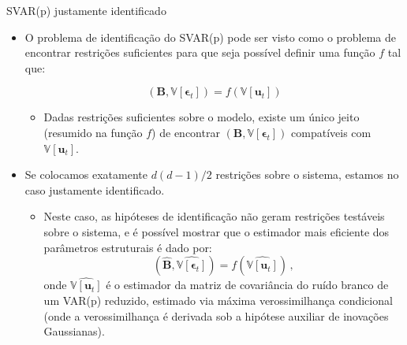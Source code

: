 \documentclass[11pt]{beamer}
\begin{document}
\begin{frame}{SVAR(p) justamente identificado}
	\begin{itemize}
		\item O problema de identificação do SVAR(p) pode ser visto como o problema de encontrar restrições suficientes para que seja possível definir uma função $f$ tal que:

		$$(\boldsymbol{B},\mathbb{V}[\boldsymbol{\epsilon}_t])=f(\mathbb{V}[\boldsymbol{u}_t])$$
	\vspace{-1em}
		\begin{itemize}
			\item Dadas restrições suficientes sobre o modelo, existe um único jeito (resumido na função $f$) de encontrar $(\boldsymbol{B},\mathbb{V}[\boldsymbol{\epsilon}_t])$ compatíveis com $\mathbb{V}[\boldsymbol{u}_t]$.
		\end{itemize}
		\item Se colocamos exatamente $d(d-1)/2$ restrições sobre o sistema, estamos no caso {\color{blue}justamente identificado}.
		\begin{itemize}
			\item Neste caso, as hipóteses de identificação não geram restrições testáveis sobre o sistema, e é possível mostrar que o estimador mais eficiente dos parâmetros estruturais é dado por:
				$$(\widehat{\boldsymbol{B}},\widehat{\mathbb{V}[\boldsymbol{\epsilon}_t]})=f(\widehat{\mathbb{V}[\boldsymbol{u}_t]})\, ,$$
			onde $\widehat{\mathbb{V}[\boldsymbol{u}_t]}$ é o estimador da matriz de covariância do ruído branco de um VAR(p) reduzido, estimado via máxima verossimilhança condicional (onde a verossimilhança é derivada sob a hipótese auxiliar de inovações Gaussianas).
		\end{itemize}
	\end{itemize}
\end{frame}
\end{document}
